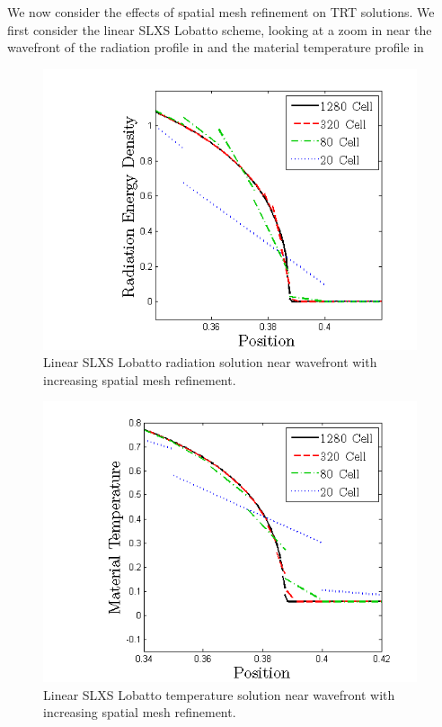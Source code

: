 We now consider the effects of spatial mesh refinement on TRT solutions.  
We first consider the linear SLXS Lobatto scheme, looking at a zoom in near the wavefront of the radiation profile in  and the material temperature profile in 
\begin{figure}[!hbp]
\centering
\includegraphics[width=11cm]{chapter6_grey_radtran/Dissertation_Data/Reorder_Marshak_Zoom_Radiation_SL_Lobatto_P1_Cell_Refinement.png}
\caption{Linear SLXS Lobatto radiation solution near wavefront with increasing spatial mesh refinement.}
\label{fig:lobatto_convergence_rad}
\end{figure}
%
%
\begin{figure}[!htp]
\centering
\includegraphics[width=11cm]{chapter6_grey_radtran/Dissertation_Data/Reorder_Marshak_Zoom_Temperature_SL_Lobatto_P1_Cell_Refinement.png}
\caption{Linear SLXS Lobatto temperature solution near wavefront with increasing spatial mesh refinement.}
\label{fig:lobatto_convergence_temp}
\end{figure}
